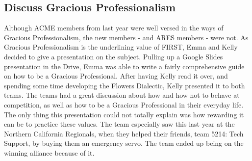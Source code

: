 \documentclass{article}
\newif\ifcontents
\begin{document}
\contentsfalse
\subsection{Discuss Gracious Professionalism}
Although ACME members from last year were well versed in the ways of Gracious Professionalism, the new members - and ARES members - were not. As Gracious Professionalism is the underlining value of FIRST, Emma and Kelly decided to give a presentation on the subject. Pulling up a Google Slides presentation in the Drive, Emma was able to write a fairly comprehensive guide on how to be a Gracious Professional. After having Kelly read it over, and spending some time developing the Flowers Dialectic, Kelly presented it to both teams. The teams had a great discussion about how and how not to behave at competition, as well as how to be a Gracious Professional in their everyday life. The only thing this presentation could not totally explain was how rewarding it can be to practice these values. The team especially saw this last year at the Northern California Regionals, when they helped their friends, team 5214: Tech Support, by buying them an emergency servo. The team ended up being on the winning alliance because of it.  
\end{document}
